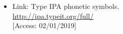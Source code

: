 \documentclass[a4paper,10pt,handout]{beamer}
\begin{document}
\begin{frame}[allowframebreaks]
{\begin{itemize}
		\item Link: Type IPA phonetic symbols.\\
		\url{http://ipa.typeit.org/full/}\\
		{[}Access: 02/01/2019]


%		


%		
%		
%		
%		
%		
%		


\end{itemize}}
\end{frame}
\end{document}
